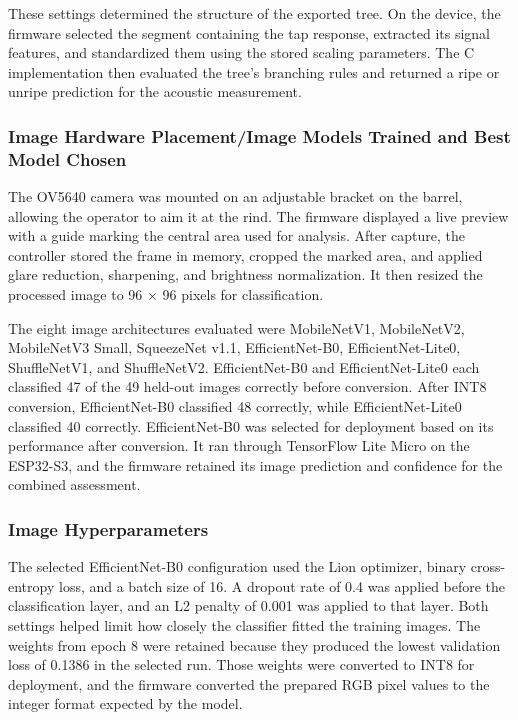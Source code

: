 \begin{thesisprose}
These settings determined the structure of the exported tree. On the device, the firmware selected the segment containing the tap response, extracted its signal features, and standardized them using the stored scaling parameters. The C implementation then evaluated the tree’s branching rules and returned a ripe or unripe prediction for the acoustic measurement.

\subsubsection*{Image Hardware Placement/Image Models Trained and Best Model Chosen}

The OV5640 camera was mounted on an adjustable bracket on the barrel, allowing the operator to aim it at the rind. The firmware displayed a live preview with a guide marking the central area used for analysis. After capture, the controller stored the frame in memory, cropped the marked area, and applied glare reduction, sharpening, and brightness normalization. It then resized the processed image to 96 \ensuremath{\times} 96 pixels for classification.

The eight image architectures evaluated were MobileNetV1, MobileNetV2, MobileNetV3 Small, SqueezeNet v1.1, EfficientNet-B0, EfficientNet-Lite0, ShuffleNetV1, and ShuffleNetV2. EfficientNet-B0 and EfficientNet-Lite0 each classified 47 of the 49 held-out images correctly before conversion. After INT8 conversion, EfficientNet-B0 classified 48 correctly, while EfficientNet-Lite0 classified 40 correctly. EfficientNet-B0 was selected for deployment based on its performance after conversion. It ran through TensorFlow Lite Micro on the ESP32-S3, and the firmware retained its image prediction and confidence for the combined assessment.

\subsubsection*{Image Hyperparameters}

The selected EfficientNet-B0 configuration used the Lion optimizer, binary cross-entropy loss, and a batch size of 16. A dropout rate of 0.4 was applied before the classification layer, and an L2 penalty of 0.001 was applied to that layer. Both settings helped limit how closely the classifier fitted the training images. The weights from epoch 8 were retained because they produced the lowest validation loss of 0.1386 in the selected run. Those weights were converted to INT8 for deployment, and the firmware converted the prepared RGB pixel values to the integer format expected by the model.


\end{thesisprose}
